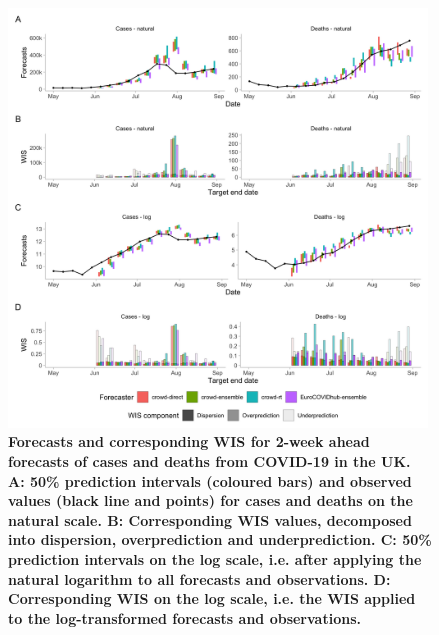 \documentclass[10pt,a4paper,twocolumn]{article}
\begin{document}
\begin{figure}
\centering
\includegraphics[width=0.99\textwidth]{../output/figures/scores-and-forecasts.png}
\caption{\bf{Forecasts and corresponding WIS for 2-week ahead forecasts of cases and deaths from COVID-19 in the UK.} A: 50\% prediction intervals (coloured bars) and observed values (black line and points) for cases and deaths on the natural scale. B: Corresponding WIS values, decomposed into dispersion, overprediction and underprediction. C: 50\% prediction intervals on the log scale, i.e. after applying the natural logarithm to all forecasts and observations. D: Corresponding WIS on the log scale, i.e. the WIS applied to the log-transformed forecasts and observations.} 
\label{fig:forecasts-scores} 
\end{figure}
\end{document}
